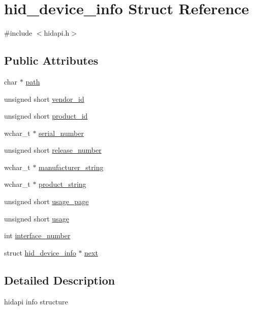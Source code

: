 \hypertarget{structhid__device__info}{\section{hid\-\_\-device\-\_\-info Struct Reference}
\label{structhid__device__info}
}


{\ttfamily \#include $<$hidapi.\-h$>$}

\subsection*{Public Attributes}
\begin{DoxyCompactItemize}
\item 
char $\ast$ \hyperlink{structhid__device__info_afd6f53bb5d44a34dabab013020d7e3e9}{path}
\item 
unsigned short \hyperlink{structhid__device__info_a5037a3914e0bd8a3f821d1be9376c709}{vendor\-\_\-id}
\item 
unsigned short \hyperlink{structhid__device__info_a04595915457b4374492edb1fdb62d65d}{product\-\_\-id}
\item 
wchar\-\_\-t $\ast$ \hyperlink{structhid__device__info_a24473469b351e7732a4890db5bcc9473}{serial\-\_\-number}
\item 
unsigned short \hyperlink{structhid__device__info_a6a832d25260f7ec17ef008e53e50e1d0}{release\-\_\-number}
\item 
wchar\-\_\-t $\ast$ \hyperlink{structhid__device__info_a69cda119ddde82c77dc2f43cb3760d15}{manufacturer\-\_\-string}
\item 
wchar\-\_\-t $\ast$ \hyperlink{structhid__device__info_ad3aef6d60ef75a0de69bb20ba6f4729c}{product\-\_\-string}
\item 
unsigned short \hyperlink{structhid__device__info_ab811117f8084ce2036815bdd33b16b3b}{usage\-\_\-page}
\item 
unsigned short \hyperlink{structhid__device__info_a47f8011d58bcddd67f1403d6d3b4cab6}{usage}
\item 
int \hyperlink{structhid__device__info_a9163d8d5d7db8dc47bddfaf876e17547}{interface\-\_\-number}
\item 
struct \hyperlink{structhid__device__info}{hid\-\_\-device\-\_\-info} $\ast$ \hyperlink{structhid__device__info_a22f653d5038cd1da1044f3b9b31f4666}{next}
\end{DoxyCompactItemize}


\subsection{Detailed Description}
hidapi info structure 

